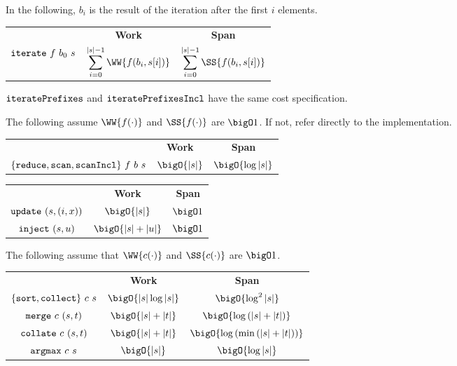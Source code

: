 \begin{flex}
\begin{costspec}[Iteration]
In the following, $b_i$ is the result of the iteration after the first $i$
elements.
\begin{tabular}{c|c|c}
& \textbf{Work} & \textbf{Span} \\
%
$\texttt{iterate}~f~b_0~s$ &
$\displaystyle \sum_{i = 0}^{|s|-1} \WW{f(b_i, s[i])}$ &
$\displaystyle \sum_{i = 0}^{|s|-1} \SS{f(b_i, s[i])}$
\end{tabular}
\end{costspec}
\begin{note}
$\texttt{iteratePrefixes}$ and $\texttt{iteratePrefixesIncl}$ have the same cost
specification.
\end{note}
\end{flex}

\begin{costspec}
The following assume $\WW{f(\cdot)}$ and $\SS{f(\cdot)}$ are $\bigO 1$. If not,
refer directly to the implementation.
\begin{tabular}{c|c|c}
& \textbf{Work} & \textbf{Span} \\
%
$\{\texttt{reduce},\texttt{scan},\texttt{scanIncl}\}~f~b~s$ &
$\displaystyle \bigO{|s|}$ &
$\displaystyle \bigO{\log{|s|}}$
%
\end{tabular}
\end{costspec}

\begin{costspec}[Updates]
\begin{tabular}{c|c|c}
& \textbf{Work} & \textbf{Span} \\
%
$\texttt{update}~(s,(i,x))$ &
$\bigO{|s|}$ &
$\bigO 1$ \\
%
$\texttt{inject}~(s,u)$ &
$\bigO{|s| + |u|}$ &
$\bigO 1$ \\
%
\end{tabular}
\end{costspec}

\begin{costspec}
The following assume that $\WW{c(\cdot)}$ and $\SS{c(\cdot)}$ are $\bigO 1$.
\begin{tabular}{c|c|c}
& \textbf{Work} & \textbf{Span} \\
%
$\{\texttt{sort},\texttt{collect}\}~c~s$ &
$\displaystyle \bigO{|s|\log{|s|}}$ &
$\displaystyle \bigO{\log^2{|s|}}$ \\
%
$\texttt{merge}~c~(s,t)$ &
$\displaystyle \bigO{|s| + |t|}$ &
$\displaystyle \bigO{\log\left(|s| + |t|\right)}$ \\
%
$\texttt{collate}~c~(s,t)$ &
$\displaystyle \bigO{|s| + |t|}$ &
$\displaystyle \bigO{\log\left(\min\left(|s| + |t|\right)\right)}$ \\
%
$\texttt{argmax}~c~s$ &
$\displaystyle \bigO{|s|}$ &
$\displaystyle \bigO{\log{|s|}}$ \\
%
\end{tabular}
\end{costspec}

